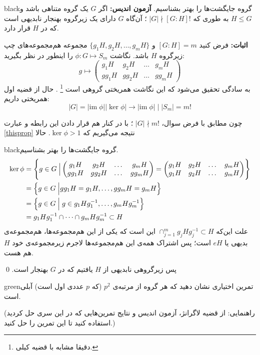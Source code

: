 \documentclass{article}
\begin{document}
\begin{boxes}{black}{گروه جایگشت‌ها را بهتر بشناسیم.}
	\vspace{0.8em}
	\textbf{آزمون اندیس:}
	اگر $G$ یک گروه متناهی باشد و $ H\leq G$ به طوری که 
	$|G| \nmid  [G:H]!$
	؛ آن‌گاه $G$ دارای یک زیرگروه بهنجار نابدیهی است که در $H$ قرار دارد.
	
	\vspace{0.6em}
	\textbf{اثبات:}
	فرض کنید 
	$[G:H] = m$
	و 
	$\{g_1H, g_2H , \dots , g_mH\}$
	مجموعه‌ هم‌مجموعه‌های چپ زیرگروه $H$ باشد. نگاشت 
	$\phi : G \longmapsto S_m$
	را اینطور در نظر بگیرید:
	\[
	g \longmapsto \begin{pmatrix}
		g_1H & g_2H & \dots & g_mH \\
		gg_1H & gg_2H & \dots & gg_mH 
	\end{pmatrix}
	\]
	به سادگی تحقیق می‌شود که این نگاشت همریختی گروهی است
	\footnote{دقیقا مشابه با قضیه کیلی.}
	. حال از قضیه اول همریختی داریم:
	\begin{equation}
		|G| = |\text{im} \; \phi||\ker \phi| \xrightarrow{} |\text{im} \;\phi|\; \big| \;|S_m| = m!
		\label{thisprop}
	\end{equation}
	
	چون مطابق با فرض سوال، 
	$|G| \nmid m!$ 
	‌؛ با در کنار هم قرار دادن این رابطه و عبارت 
	\eqref{thisprop}
	نتیجه می‌گیریم که 
	$\ker \phi > 1$. حالا
\end{boxes}
\begin{boxes}{black}{گروه جایگشت‌ها را بهتر بشناسیم.}
		\begin{equation*}
		\begin{aligned}
			\ker \phi& = \Biggl\{
			g \in G  \;\Big| \begin{pmatrix}
				g_1H & g_2H & \dots & g_mH \\
				gg_1H & gg_2H & \dots & gg_mH
			\end{pmatrix} = 
			\begin{pmatrix}
				g_1H & g_2H & \dots & g_mH \\
				g_1H & g_2H & \dots & g_mH
			\end{pmatrix}
			\Biggr\}
			\\&=
			\Bigl\{g\in G \; \Big| gg_1H = g_1H , \dots , gg_mH = g_mH \Bigr\} \\ &=
			\Bigl\{ g \in G \; \Big| \; g\in g_1 H g_1^{-1}, \dots , g_mHg_m^{-1}\Bigr\} \\ &= g_1Hg_1^{-1} \cap \dots \cap g_m H g_m^{-1} \subset H
		\end{aligned}
	\end{equation*}
	علت این‌که 
	$\cap_{j=1}^m g_j H g_j^{-1} \subset H$
	این است که یکی از این هم‌مجموعه‌ها، هم‌مجموعه‌ی بدیهی یا $eH$ است؛ پس اشتراک همه‌ی این هم‌مجموعه‌ها لاجرم زیرمجموعه‌ی خود $H$ هم هست.
	
	پس زیرگروهی نابدیهی از $H$ یافتیم که در $G$ بهنجار است.
	\qed
	
	\begin{boxes}{green}{تمرین اختیاری}
		نشان دهید که هر گروه از مرتبه‌‌ی $p^2$ (که $p$ عددی اول است) آبلی است.
		
		(راهنمایی: از قضیه لاگرانژ، آزمون اندیس و نتایج تمرین‌هایی که در این سری حل کردید استفاده کنید تا این تمرین را حل کنید.)
	\end{boxes}
\end{boxes}



\vspace{1em}
 
\end{document}
